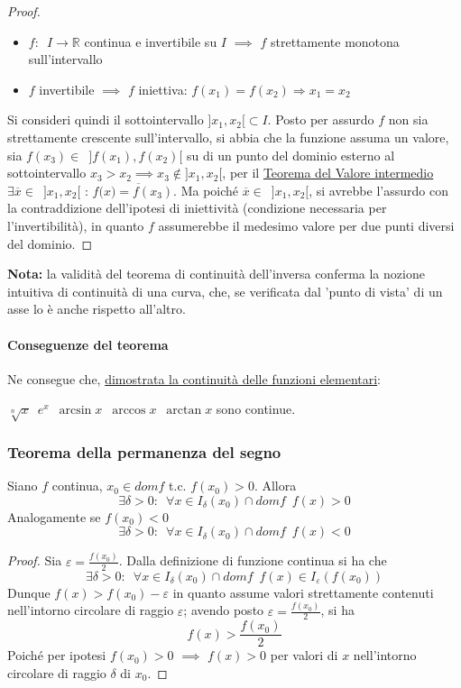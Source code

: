 \documentclass[10pt]{article}
\theoremstyle{plain}
\begin{document}
\begin{proof}
\begin{itemize}[label=$\cdot$]
    \item  $f: \enspace I \rightarrow \mathbb{R}$ continua e invertibile su $I$ $\implies$ $f$ strettamente monotona sull'intervallo
    \item $f$ invertibile $\implies$ $f$ iniettiva: $f(x_1) = f(x_2) \Rightarrow x_1 = x_2$
\end{itemize} 
Si consideri quindi il sottointervallo $]x_1, x_2[ \subset I$. Posto per assurdo $f$ non sia strettamente crescente sull'intervallo, si abbia che la funzione assuma un valore, sia $f(x_3) \in \enspace ]f(x_1), f(x_2)[$ su di un punto del dominio esterno al sottointervallo $x_3 > x_2 \implies x_3 \notin ]x_1, x_2[$, per il \hyperlink{valint}{Teorema del Valore intermedio} $\exists \overline{x} \in \enspace ]x_1, x_2[$ : $f(\overline{x) = f(x_3)}$. Ma poiché $\overline{x} \in \enspace ]x_1, x_2[$, si avrebbe l'assurdo con la contraddizione dell'ipotesi di iniettività (condizione necessaria per l'invertibilità), in quanto $f$ assumerebbe il medesimo valore per due punti diversi del dominio.
\end{proof}
\textbf{Nota:} la validità del teorema di continuità dell'inversa conferma la nozione intuitiva di continuità di una curva, che, se verificata dal 'punto di vista' di un asse lo è anche rispetto all'altro.

\paragraph{Conseguenze del teorema}
Ne consegue che, \hyperlink{elementarii}{dimostrata la continuità delle funzioni elementari}:\\ \begin{center}$\sqrt[n]{x} \enspace e^x \enspace \arcsin{x} \enspace \arccos{x} \enspace \arctan{x}$ sono continue.\end{center}

\subsubsection{Teorema della permanenza del segno}
\label{subsubsec:perman}
\begin{ther}[\textbf{T. p. s.}]
Siano $f$ continua, $x_0 \in dom f$ t.c. $f(x_0) > 0$. Allora
\[\exists \delta > 0 : \enspace \forall x \in I_{\delta}(x_0) \cap dom f \enspace f(x) > 0\]
Analogamente se $f(x_0) < 0$
\[\exists \delta > 0 : \enspace \forall x \in I_{\delta}(x_0) \cap dom f \enspace f(x) < 0\]
\end{ther}
\begin{proof}
Sia $\varepsilon = \frac{f(x_0)}{2}$. Dalla definizione di funzione continua si ha che 
\[\exists \delta > 0 : \enspace \forall x \in I_{\delta}(x_0) \cap dom f \enspace f(x) \in I_{\varepsilon}(f(x_0))\]
Dunque $f(x) > f(x_0) - \varepsilon$ in quanto assume valori strettamente contenuti nell'intorno circolare di raggio $\varepsilon$; avendo posto $\varepsilon = \frac{f(x_0)}{2}$, si ha \[f(x) > \frac{f(x_0)}{2}\] Poiché per ipotesi $f(x_0) > 0$ $\implies$ $f(x) > 0$ per valori di $x$ nell'intorno circolare di raggio $\delta$ di $x_0$.
\end{proof}
\end{document}
